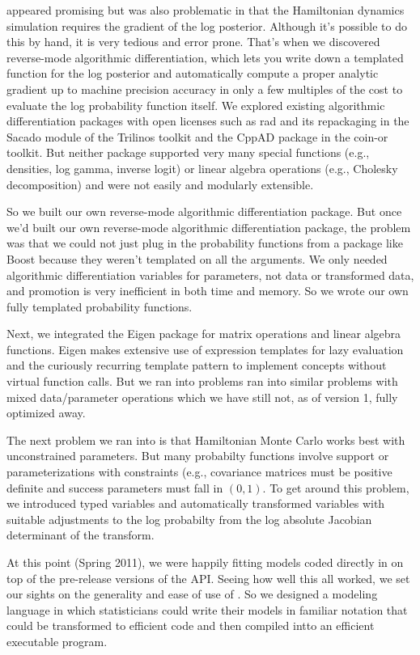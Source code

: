 \HMC appeared promising but was also problematic in that the
Hamiltonian dynamics simulation requires the gradient of the log
posterior.  Although it's possible to do this by hand, it is very
tedious and error prone.  That's when we discovered reverse-mode
algorithmic differentiation, which lets you write down a templated
\Cpp function for the log posterior and automatically compute a proper
analytic gradient up to machine precision accuracy in only a few
multiples of the cost to evaluate the log probability function itself.
We explored existing algorithmic differentiation packages with open
licenses such as {\sc rad} \cite{Gay:2005} and its repackaging in the
Sacado module of the Trilinos toolkit and the {\small CppAD} package in the
{\sc coin-or} toolkit.  But neither package supported very many
special functions (e.g., densities, log gamma, inverse logit) or
linear algebra operations (e.g., Cholesky decomposition) and were not
easily and modularly extensible.  

So we built our own reverse-mode algorithmic differentiation package.
But once we'd built our own reverse-mode algorithmic differentiation
package, the problem was that we could not just plug in the
probability functions from a package like Boost because they weren't
templated on all the arguments.  We only needed algorithmic
differentiation variables for parameters, not data or transformed
data, and promotion is very inefficient in both time and memory.  So
we wrote our own fully templated probability functions.  

Next, we integrated the Eigen \Cpp package for matrix operations and
linear algebra functions.  Eigen makes extensive use of expression
templates for lazy evaluation and the curiously recurring template
pattern to implement concepts without virtual function calls.  But we
ran into problems ran into similar problems with mixed data/parameter
operations which we have still not, as of \Stan version 1, fully
optimized away.

The next problem we ran into is that Hamiltonian Monte Carlo works
best with unconstrained parameters.  But many probabilty functions
involve support or parameterizations with constraints (e.g.,
covariance matrices must be positive definite and success parameters
must fall in $(0,1)$.  To get around this problem, we introduced typed
variables and automatically transformed variables with suitable
adjustments to the log probabilty from the log absolute Jacobian
determinant of the transform.

At this point (Spring 2011), we were happily fitting models coded
directly in \Cpp on top of the pre-release versions of the \Stan API.
Seeing how well this all worked, we set our sights on the generality
and ease of use of \BUGS.  So we designed a modeling language in which
statisticians could write their models in familiar notation that could
be transformed to efficient \Cpp code and then compiled intto an
efficient executable program.

